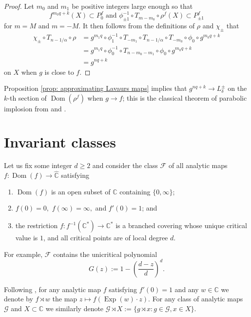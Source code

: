 \documentclass[12pt,letterpaper]{amsart}
\numberwithin{equation}{section}
\theoremstyle{remark}
\theoremstyle{definition}
\newcommand{\C}{\mathbb C}
\DeclareMathOperator{\Dom}{Dom}
\DeclareMathOperator{\Exp}{Exp}
\begin{document}
	\begin{proof}
		Let $m_0$ and $m_1$ be positive integers large enough so that 
		$$f^{m_0q+k}(X)\subset P_0^f \text{ and } \phi_{\pm1}^{-1}\circ T_{m-m_0}\circ\rho^f(X)\subset P_{\pm 1}^f$$
		for $m= M$ and $m=-M$.
		It then follows from the definitions of  $\rho$ and $\chi_\pm$ that
		\begin{align*}
			\chi_\pm\circ T_{n-1/\alpha}\circ \rho &= g^{m_1q}\circ \phi_1^{-1}\circ T_{-m_1}\circ T_{n-1/\alpha}\circ T_{-m_0}\circ \phi_0\circ g^{m_0q+k}\\
			&= g^{m_1q}\circ \phi_0^{-1}\circ T_{n-m_0-m_1}\circ \phi_0\circ g^{m_0q+k}\\
			& = g^{nq+k}
		\end{align*}
		on $X$ when $g$ is close to $f$.
	\end{proof}
	
	
	
	Proposition \ref{prop: approximating Lavaurs maps} implies that $g^{nq+k}\to L_\delta^\pm$ on the $k$-th section of $\Dom(\rho^f)$ when $g\to f$; this is the classical theorem of parabolic implosion from \cite{douady} and \cite{Lavaurs}.
	
	
	
	\section{Invariant classes}\label{sec:classes}
	
	Let us fix some integer $d\geq 2$ and consider the class ${\mathcal{F}}$ of all analytic maps $f: \Dom(f)\to \hat{\mathbb{C}}$ satisfying
	\begin{enumerate}
		\item $\Dom(f)$ is an open subset of ${\mathbb{C}}$ containing $\{0, \infty\}$;
		\item $f(0) = 0,$ $f(\infty) = \infty,$ and $ f'(0) = 1$; and
		\item the restriction 
		$f: f^{-1}(\mathbb{C}^*)\to \mathbb{C}^*$
		is a branched covering whose unique critical value is $1$, and all critical points 
		are of local degree $d$.
	\end{enumerate}
	For example, $\mathcal{F}$ contains the unicritical polynomial 
	$$G(z):= 1- \left(\frac{d-z}{d}\right)^d.$$
	
	
	Following \cite{CS_satellite}, for any analytic map $f$ satisfying $f'(0) = 1$ and any $w\in \mathbb{C}$ we denote by $f\rtimes w$ the map $z\mapsto f( \Exp(w)\cdot z)$. For any class of analytic maps $\mathcal{G}$ and $X\subset \C$ we similarly denote $\mathcal{G}\rtimes X:= \{g\rtimes x: g\in \mathcal{G}, x\in X\}$.
	
\end{document}
